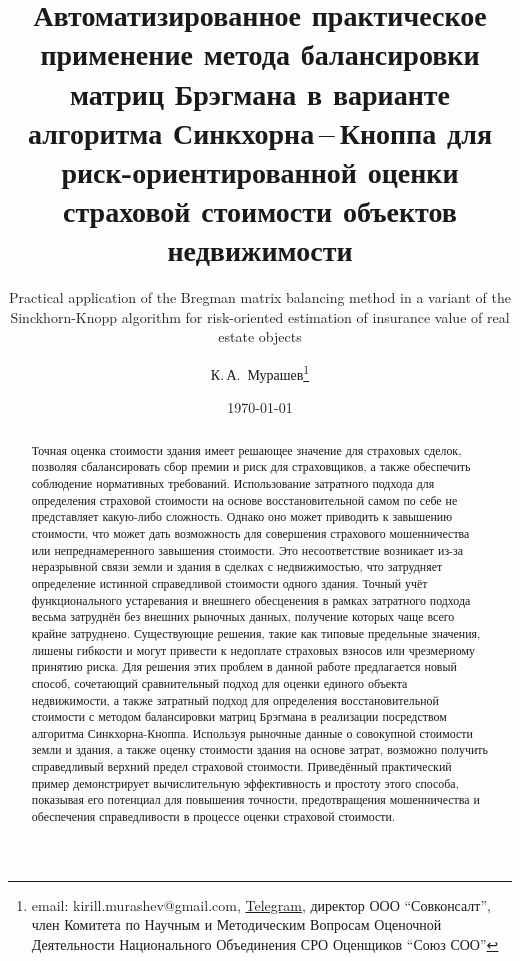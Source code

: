 \documentclass[12pt]{scrartcl}
\title{Автоматизированное практическое применение метода балансировки матриц Брэгмана в варианте алгоритма Синкхорна\,--\,Кноппа для риск-ориентированной оценки страховой стоимости объектов недвижимости}
\subtitle{\foreignlanguage{english}{Practical application of the Bregman matrix balancing method in a variant of the Sinckhorn-Knopp algorithm for risk-oriented estimation of insurance value of real estate objects}}
\author{К.\,А.~Мурашев\thanks{email: kirill.murashev@gmail.com, \href{https://t.me/AIinValuation}{Telegram}, директор ООО ``Совконсалт'', член Комитета по Научным и Методическим Вопросам Оценочной Деятельности Национального Объединения СРО Оценщиков ``Союз СОО''}}
\date{\today}
\begin{document}
\maketitle

\begin{abstract}
Точная оценка стоимости здания имеет решающее значение для страховых сделок, позволяя сбалансировать сбор премии и риск для страховщиков, а также обеспечить соблюдение нормативных требований. Использование затратного подхода для определения страховой стоимости на основе восстановительной самом по себе не представляет какую-либо сложность. Однако оно может приводить к завышению стоимости, что может дать возможность для совершения страхового мошенничества или непреднамеренного завышения стоимости. Это несоответствие возникает из-за неразрывной связи земли и здания в сделках с недвижимостью, что затрудняет определение истинной справедливой стоимости одного здания. Точный учёт функционального устаревания и внешнего обесценения в рамках затратного подхода весьма затруднён без внешних рыночных данных, получение которых чаще всего крайне затруднено. Существующие решения, такие как типовые предельные значения, лишены гибкости и могут привести к недоплате страховых взносов или чрезмерному принятию риска. Для решения этих проблем в данной работе предлагается новый способ, сочетающий сравнительный подход для оценки единого объекта недвижимости, а также затратный подход для определения восстановительной стоимости с методом балансировки матриц Брэгмана в реализации посредством алгоритма Синкхорна-Кноппа. Используя рыночные данные о совокупной стоимости земли и здания, а также оценку стоимости здания на основе затрат, возможно получить справедливый верхний предел страховой стоимости. Приведённый практический пример демонстрирует вычислительную эффективность и простоту этого способа, показывая его потенциал для повышения точности, предотвращения мошенничества и обеспечения справедливости в процессе оценки страховой стоимости.



\end{abstract}
\end{document}
